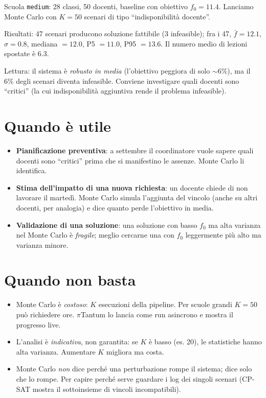 \begin{esempiobox}
Scuola \texttt{medium}: 28 classi, 50 docenti, baseline con
obiettivo $f_0 = 11.4$. Lanciamo Monte Carlo con $K = 50$
scenari di tipo ``indisponibilit\`a docente''.

Risultati: 47 scenari producono soluzione fattibile (3
infeasible); fra i 47, $\bar{f} = 12.1$, $\sigma = 0.8$,
mediana $= 12.0$, P5 $= 11.0$, P95 $= 13.6$. Il numero
medio di lezioni spostate \`e 6.3.

Lettura: il sistema \`e \emph{robusto in media} (l'obiettivo
peggiora di solo $\sim 6\%$), ma il 6\% degli scenari
diventa infeasible. Conviene investigare quali docenti sono
``critici'' (la cui indisponibilit\`a aggiuntiva rende il
problema infeasible).
\end{esempiobox}

\section{Quando \`e utile}

\begin{ideabox}
\begin{itemize}
\item \textbf{Pianificazione preventiva}: a settembre il
  coordinatore vuole sapere quali docenti sono ``critici''
  prima che si manifestino le assenze. Monte Carlo li
  identifica.
\item \textbf{Stima dell'impatto di una nuova richiesta}:
  un docente chiede di non lavorare il marted\`i. Monte
  Carlo simula l'aggiunta del vincolo (anche su altri
  docenti, per analogia) e dice quanto perde l'obiettivo
  in media.
\item \textbf{Validazione di una soluzione}: una soluzione
  con basso $f_0$ ma alta varianza nel Monte Carlo \`e
  \emph{fragile}; meglio cercarne una con $f_0$
  leggermente pi\`u alto ma varianza minore.
\end{itemize}
\end{ideabox}

\section{Quando non basta}

\begin{avvertenzabox}
\begin{itemize}
\item Monte Carlo \`e \emph{costoso}: $K$ esecuzioni della
  pipeline. Per scuole grandi $K = 50$ pu\`o richiedere
  ore. $\pi$Tantum lo lancia come run asincrono e mostra
  il progresso live.
\item L'analisi \`e \emph{indicativa}, non garantita: se
  $K$ \`e basso (es. 20), le statistiche hanno alta
  varianza. Aumentare $K$ migliora ma costa.
\item Monte Carlo \emph{non} dice perch\'e una perturbazione
  rompe il sistema; dice solo che lo rompe. Per capire
  perch\'e serve guardare i log dei singoli scenari
  (CP-SAT mostra il sottoinsieme di vincoli incompatibili).
\end{itemize}
\end{avvertenzabox}

